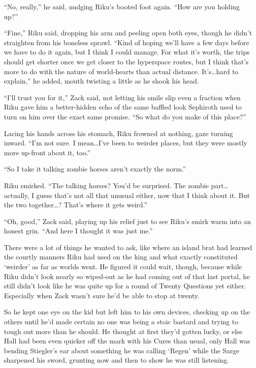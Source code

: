 ``No, really,'' he said, nudging Riku's booted foot again. ``How are you holding up?''
\begin{sloppypar}
``Fine,'' Riku said, dropping his arm and peeling open both eyes, though he didn't straighten from his boneless sprawl. ``Kind of hoping we'll have a few days before we have to do it again, but I think I could manage. For what it's worth, the trips should get shorter once we get closer to the hyperspace routes, but I think that's more to do with the nature of world-hearts than actual distance. It's\ldots hard to explain,'' he added, mouth twisting a little as he shook his head.
\end{sloppypar}
``I'll trust you for it,'' Zack said, not letting his smile slip even a fraction when Riku gave him a better-hidden echo of the same baffled look Sephiroth used to turn on him over the exact same promise. ``So what do you make of this place?''

Lacing his hands across his stomach, Riku frowned at nothing, gaze turning inward. ``I'm not sure. I mean\ldots I've been to weirder places, but they were mostly more up-front about it, too.''

``So I take it talking zombie horses aren't exactly the norm.''

Riku smirked. ``The talking horses? You'd be surprised. The zombie part\ldots actually, I guess that's not all that unusual either, now that I think about it. But the two together\ldots ? That's where it gets weird.''

``Oh, good,'' Zack said, playing up his relief just to see Riku's smirk warm into an honest grin. ``And here I thought it was just me.''

There were a lot of things he wanted to ask, like where an island brat had learned the courtly manners Riku had used on the king and what exactly constituted `weirder' as far as worlds went. He figured it could wait, though, because while Riku didn't look nearly so wiped-out as he had coming out of that last portal, he still didn't look like he was quite up for a round of Twenty Questions yet either. Especially when Zack wasn't sure he'd be able to stop at twenty.

So he kept one eye on the kid but left him to his own devices, checking up on the others until he'd made certain no one was being a stoic bastard and trying to tough out more than he should. He thought at first they'd gotten lucky, or else Hall had been even quicker off the mark with his Cures than usual, only Hall was bending Stiegler's ear about something he was calling `Regen' while the Sarge sharpened his sword, grunting now and then to show he was still listening.

